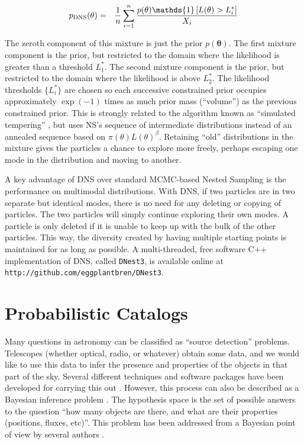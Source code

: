 \documentclass[
  ,final            %
  ]
  {aipproc}
\newcommand{\pars}{\boldsymbol{\theta}}
\begin{document}
\begin{eqnarray}
p_{\rm DNS}(\theta) &=& \frac{1}{n}\sum_{i=1}^n
\frac{p(\theta)\mathds{1}\left[L(\theta) > L^*_i\right]}{X_i}
\end{eqnarray}

The zeroth component of this mixture is just the prior $p(\pars)$. The first
mixture component is the prior, but restricted to the domain where the
likelihood is greater than a threshold $L^*_1$. The second mixture component
is the prior, but restricted to the domain where the likelihood is above
$L^*_2$. The likelihood thresholds $\{ L^*_i \}$ are chosen so each
successive constrained prior occupies approximately $\exp(-1)$ times as much
prior mass (``volume'') as the previous constrained prior. This is strongly
related to the algorithm known as ``simulated tempering''
\citep{simulated_tempering}, but uses NS's
sequence of intermediate distributions instead of an annealed sequence
based on $\pi(\theta)L(\theta)^\beta$. Retaining ``old'' distributions in the
mixture gives the particles a chance to explore more freely, perhaps escaping
one mode in the distribution and moving to another.

A key advantage of DNS over standard MCMC-based Nested Sampling is the performance
on multimodal distributions. With DNS, if two particles are in two separate
but identical modes, there is no need for any deleting or copying of particles.
The two particles will simply continue exploring their own modes. A particle is
only deleted if it is unable to keep up with the bulk of the other particles.
This way, the diversity created by having multiple starting points is maintained
for as long as possible. A multi-threaded, free software C++ implementation of
DNS, called {\tt DNest3},
is available online at {\tt http://github.com/eggplantbren/DNest3}.

\section{Probabilistic Catalogs}
Many questions in astronomy can be classified as ``source detection'' problems.
Telescopes (whether optical, radio, or whatever) obtain some data, and we would
like to use this data to infer the presence and properties of the objects in
that part of the sky. Several different techniques and software packages have
been developed for carrying this out \citep[e.g.][]{sextractor, dolphot}.
However, this process
can also be described as a Bayesian inference problem \citep{starfield}.
The hypothesis space is the set of possible answers to the question
``how many objects are there, and what are their properties (positions, fluxes,
etc)''. This problem has been addressed from a Bayesian point of view by several
authors \citep[e.g.][]{2003MNRAS.338..765H}.
\end{document}
